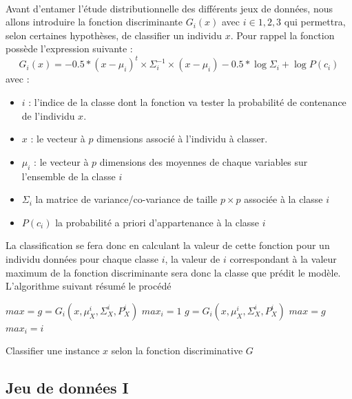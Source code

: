 \paragraph{}
Avant d'entamer l'étude distributionnelle des différents jeux de données, nous allons introduire la fonction discriminante $G_i(x)$ avec $i\in{1,2,3}$ qui permettra, selon certaines hypothèses, de classifier un individu $x$. Pour rappel la fonction possède l'expression suivante : 
\begin{equation*}
	G_i(x) = -0.5*(x-\mu_i)^t \times \Sigma_i^{-1} \times (x-\mu_i) - 0.5 * \log{\Sigma_i} + \log{P(c_i)}
\end{equation*}
avec : 
\begin{itemize}
	\item $i$ : l'indice de la classe dont la fonction va tester la probabilité de contenance de l'individu $x$.
	\item $x$ : le vecteur à $p$ dimensions associé à l'individu à classer.
	\item $\mu_i$ : le vecteur à $p$ dimensions des moyennes de chaque variables sur l'ensemble de la classe $i$
	\item $\Sigma_i$ la matrice de variance/co-variance de taille $p \times p$ associée à la classe $i$
	\item $P(c_i)$ la probabilité a priori d'appartenance à la classe $i$
\end{itemize}
	\par
	La classification se fera donc en calculant la valeur de cette fonction pour un individu données pour chaque classe $i$, la valeur de $i$ correspondant à la valeur maximum de la fonction discriminante sera donc la classe que prédit le modèle. L'algorithme suivant résumé le procédé 
	\par 
	\begin{algorithm}[H]
		
		$max = g = G_i(x,\mu_X^i, \Sigma_X^i,P_X^i)$\;
		$max_i = 1$\;
		 {
			$g = G_i(x,\mu_X^i, \Sigma_X^i,P_X^i)$\;
			 {
				$max = g$\;
				$max_i =i$
			}
		}
		\;
		\caption{Classifier une instance $x$ selon la fonction discriminative $G$}
		\label{algo:predict}
	\end{algorithm}
	
\subsection{Jeu de données I}
